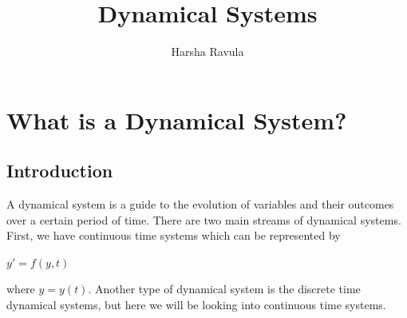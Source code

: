 \documentclass{article}
\title{Dynamical Systems}
\author{Harsha Ravula}
\begin{document}
\maketitle
\newpage
\tableofcontents
\newpage
\section{What is a Dynamical System?}
\subsection{Introduction}
A dynamical system is a guide to the evolution of variables and their outcomes over a certain period of time. There are two main streams of dynamical systems.
First, we have continuous time systems which can be represented by 
\linebreak
\newline
\begin{center}
    \textsc{$y' = f(y,t)$}   
 \end{center}
where $y = y(t)$. 
\newline
\linebreak
Another type of dynamical system is the discrete time dynamical systems, but here we will be looking into continuous time systems.
\end{document}
